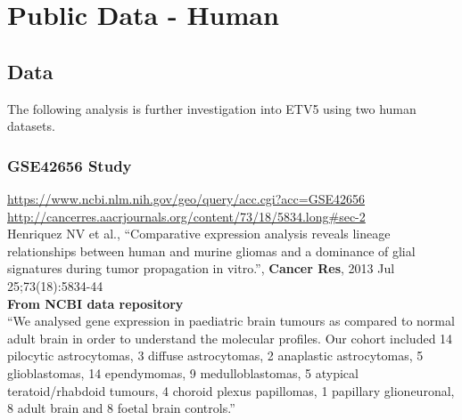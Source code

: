 \documentclass{article}\usepackage[]{graphicx}\usepackage[]{color}
\begin{document}

\newpage
\section{Public Data - Human}

\subsection{Data}
The following analysis is further investigation into ETV5 using two human datasets.  

\subsubsection{GSE42656 Study}
\url{https://www.ncbi.nlm.nih.gov/geo/query/acc.cgi?acc=GSE42656}\\
\url{http://cancerres.aacrjournals.org/content/73/18/5834.long#sec-2}\\
Henriquez NV et al., ``Comparative expression analysis reveals lineage relationships between human and murine gliomas and a dominance of glial signatures during tumor propagation in vitro.'', {\bf Cancer Res}, 2013 Jul 25;73(18):5834-44\\


{\bf From NCBI data repository} \\
``We analysed gene expression in paediatric brain tumours as compared to normal adult brain in order to understand the molecular profiles. Our cohort included 14 pilocytic astrocytomas, 3 diffuse astrocytomas, 2 anaplastic astrocytomas, 5 glioblastomas, 14 ependymomas, 9 medulloblastomas, 5 atypical teratoid/rhabdoid tumours, 4 choroid plexus papillomas, 1 papillary glioneuronal, 8 adult brain and 8 foetal brain controls.''\\
\end{document}
